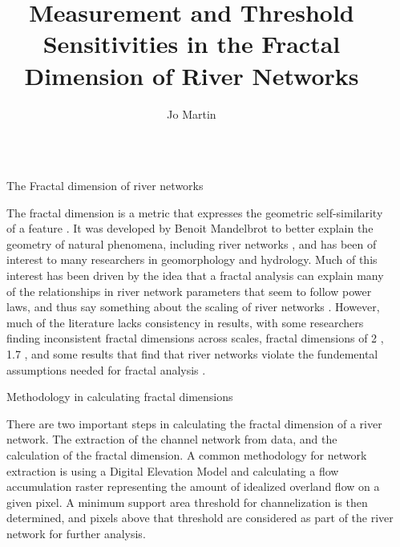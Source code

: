 \documentclass[final]{beamer}
\title{Measurement and Threshold Sensitivities in the Fractal Dimension of River Networks}
\author{Jo Martin \inst{1}}
\institute[shortinst]{\inst{1} University of Colorado, Boulder}
\newlength{\sepwidth}
\newlength{\colwidth}
\newcommand{\separatorcolumn}{\begin{column}{\sepwidth}\end{column}}
\begin{document}
\begin{frame}[t]
\begin{columns}[t]
\separatorcolumn

\begin{column}{\colwidth}

  \begin{block}{The Fractal dimension of river networks}

    The fractal dimension is a metric that expresses the geometric self-similarity of a feature \cite{Feder1988}.  It was developed by Benoit Mandelbrot to better explain the geometry of natural phenomena, including river networks \cite{mandelbrot1982fractal}, and has been of interest to many researchers in geomorphology and hydrology.  Much of this interest has been driven by the idea that a fractal analysis can explain many of the relationships in river network parameters that seem to follow power laws, and thus say something about the scaling of river networks \cite{maritan1996scaling}.  However, much of the literature lacks consistency in results, with some researchers finding inconsistent fractal dimensions across scales, fractal dimensions of 2 \cite{tarboton1988fractal}, 1.7 \cite{claps1996reexamining}, and some results that find that river networks violate the fundemental assumptions needed for fractal analysis \cite{beauvais1997channel}.

  \end{block}

  \begin{block}{Methodology in calculating fractal dimensions}

    There are two important steps in calculating the fractal dimension of a river network.  The extraction of the channel network from data, and the calculation of the fractal dimension.  A common methodology for network extraction is using a Digital Elevation Model and calculating a flow accumulation raster representing the amount of idealized overland flow on a given pixel.  A minimum support area threshold for channelization is then determined, and pixels above that threshold are considered as part of the river network for further analysis.


\end{block}
\end{column}
\end{columns}
\end{frame}
\end{document}

